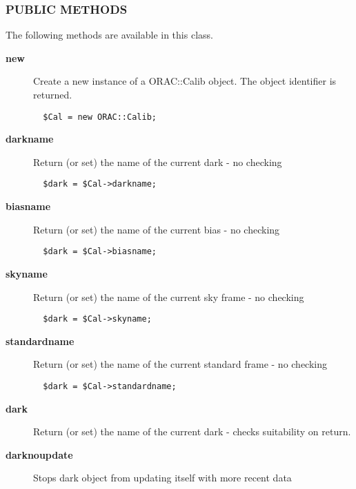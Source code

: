 \subsubsection*{PUBLIC METHODS\label{ORAC::Calib_PUBLIC_METHODS}}

The following methods are available in this class.

\begin{description}
\item[\textbf{new}] \mbox{}

Create a new instance of a ORAC::Calib object.
The object identifier is returned.

\begin{verbatim}
  $Cal = new ORAC::Calib;
\end{verbatim}
\item[\textbf{darkname}] \mbox{}

Return (or set) the name of the current dark - no checking

\begin{verbatim}
  $dark = $Cal->darkname;
\end{verbatim}
\item[\textbf{biasname}] \mbox{}

Return (or set) the name of the current bias - no checking

\begin{verbatim}
  $dark = $Cal->biasname;
\end{verbatim}
\item[\textbf{skyname}] \mbox{}

Return (or set) the name of the current sky frame - no checking

\begin{verbatim}
  $dark = $Cal->skyname;
\end{verbatim}
\item[\textbf{standardname}] \mbox{}

Return (or set) the name of the current standard frame - no checking

\begin{verbatim}
  $dark = $Cal->standardname;
\end{verbatim}
\item[\textbf{dark}] \mbox{}

Return (or set) the name of the current dark - 
checks suitability on return.

\item[\textbf{darknoupdate}] \mbox{}

Stops dark object from updating itself with more recent data




\end{description}
